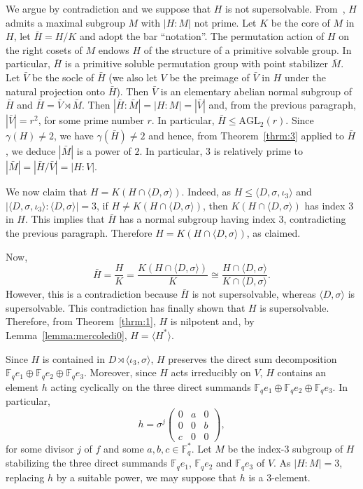 \documentclass{amsart}
\begin{document}
We argue by contradiction and we suppose that $H$ is not supersolvable. From~\cite[5.4.7]{robinson}, $H$ admits a maximal subgroup $M$ with $|H:M|$ not prime. Let $K$ be the core of $M$ in $H$, let $\bar H=H/K$ and adopt the bar ``notation''. The permutation action of $H$ on the right cosets of $M$ endows $H$ of the structure of a primitive solvable group. In particular, $\bar H$ is a primitive soluble permutation group with point stabilizer $\bar M$. Let $\bar V$ be the socle of $\bar H$ (we also let $V$ be the preimage of $\bar V$ in $H$ under the natural projection onto $\bar H$). Then $\bar V$ is an elementary abelian normal subgroup of $\bar H$ and $\bar H=\bar V\rtimes \bar M$. Then $|\bar H:\bar M|=|H:M|=|\bar V|$ and, from the previous paragraph, $|\bar V|=r^2$, for some prime number $r$. In particular, $\bar H\le \mathrm{AGL}_2(r)$. Since $\gamma(H)\ne 2$, we have $\gamma(\bar H)\ne 2$ and hence, from Theorem~\ref{thrm:3} applied to $\bar H$, we deduce $|\bar M|$ is a power of $2$. In particular, $3$ is relatively prime to $|\bar M|=|\bar H/\bar V|=|H:V|$. 

We now claim that $H=K(H\cap \langle D,\sigma\rangle)$. Indeed, as $H\le \langle D,\sigma,\iota_3\rangle$ and $|\langle D,\sigma,\iota_3\rangle:\langle D,\sigma\rangle|=3$, if $H\ne K(H\cap \langle D,\sigma\rangle)$, then $K(H\cap \langle D,\sigma\rangle)$ has index $3$ in $H$. This implies that $\bar H$ has a normal subgroup having index $3$, contradicting the previous paragraph. Therefore $H=K(H\cap \langle D,\sigma\rangle)$, as claimed.

Now, $$\bar H=\frac{H}{K}=\frac{K(H\cap \langle D,\sigma\rangle)}{K}\cong \frac{H\cap \langle D,\sigma\rangle}{K\cap \langle D,\sigma\rangle}.$$
However, this is a contradiction because $\bar H$ is not supersolvable, whereas $\langle D,\sigma\rangle$ is supersolvable. This contradiction has finally shown that $H$ is supersolvable. Therefore, from Theorem~\ref{thrm:1}, $H$ is nilpotent and, by Lemma~\ref{lemma:mercoledi0}, $H=\langle H^\ast\rangle$.



Since $H$ is contained in $D\rtimes\langle\iota_3,\sigma\rangle$, $H$ preserves the direct sum decomposition $\mathbb{F}_qe_1\oplus\mathbb{F}_qe_2\oplus\mathbb{F}_qe_3$. Moreover, since $H$ acts irreducibly on $V$, $H$ contains an element $h$ acting cyclically on the three direct summands $\mathbb{F}_qe_1\oplus\mathbb{F}_qe_2\oplus\mathbb{F}_qe_3$. In particular,
$$h=\sigma^j
\begin{pmatrix}
0&a&0\\
0&0&b\\
c&0&0
\end{pmatrix},$$
for some divisor $j$ of $f$ and some $a,b,c\in\mathbb{F}_q^\ast$. Let $M$ be the index-3 subgroup of $H$ stabilizing the three direct summands $\mathbb{F}_qe_1$, $\mathbb{F}_qe_2$ and $\mathbb{F}_qe_3$ of $V$. As $|H:M|=3$, replacing $h$ by a suitable power, we may suppose that $h$ is a $3$-element.
\end{document}
